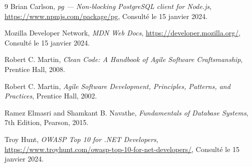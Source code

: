 \begin{thebibliography}{9}
Brian Carlson,
\textit{pg — Non-blocking PostgreSQL client for Node.js},
\url{https://www.npmjs.com/package/pg},
Consulté le 15 janvier 2024.

Mozilla Developer Network,
\textit{MDN Web Docs},
\url{https://developer.mozilla.org/},
Consulté le 15 janvier 2024.

Robert C. Martin,
\textit{Clean Code: A Handbook of Agile Software Craftsmanship},
Prentice Hall, 2008.

Robert C. Martin,
\textit{Agile Software Development, Principles, Patterns, and Practices},
Prentice Hall, 2002.

Ramez Elmasri and Shamkant B. Navathe,
\textit{Fundamentals of Database Systems},
7th Edition, Pearson, 2015.

Troy Hunt,
\textit{OWASP Top 10 for .NET Developers},
\url{https://www.troyhunt.com/owasp-top-10-for-net-developers/},
Consulté le 15 janvier 2024.

\end{thebibliography}


